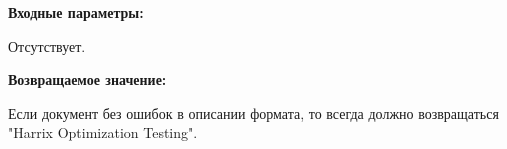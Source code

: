 \textbf{Входные параметры:}

Отсутствует.

\textbf{Возвращаемое значение:}

Если документ без ошибок в описании формата, то всегда должно возвращаться "Harrix Optimization Testing".